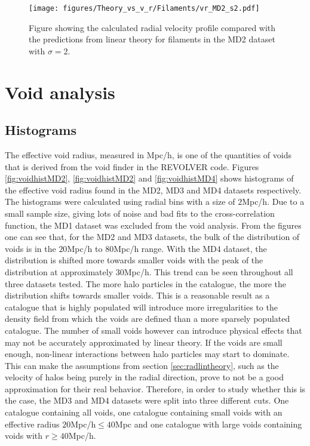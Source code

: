 \begin{figure}[H]
    \texttt{[image: figures/Theory\_vs\_v\_r/Filaments/vr\_MD2\_s2.pdf]}
    \caption{Figure showing the calculated radial velocity profile compared with the predictions from linear theory for filaments in the MD2 dataset with $\sigma=2$.}
    \label{fig:filvrMD2s2}
\end{figure}
\section{Void analysis}\label{sec:void}
\subsection{Histograms}
The effective void radius, measured in Mpc/h, is one of the quantities of voids that is derived from the void finder in the REVOLVER code. Figures \ref{fig:voidhistMD2}, \ref{fig:voidhistMD2} and \ref{fig:voidhistMD4} shows histograms of the effective void radius found in the MD2, MD3 and MD4 datasets respectively. The histograms were calculated using radial bins with a size of $2$Mpc/h. Due to a small sample size, giving lots of noise and bad fits to the cross-correlation function, the MD1 dataset was excluded from the void analysis. From the figures one can see that, for the MD2 and MD3 datasets, the bulk of the distribution of voids is in the $20$Mpc/h to $80$Mpc/h range. With the MD4 dataset, the distribution is shifted more towards smaller voids with the peak of the distribution at approximately $30$Mpc/h. This trend can be seen throughout all three datasets tested. The more halo particles in the catalogue, the more the distribution shifts towards smaller voids. This is a reasonable result as a catalogue that is highly populated will introduce more irregularities to the density field from which the voids are defined than a more sparsely populated catalogue. The number of small voids however can introduce physical effects that may not be accurately approximated by linear theory. If the voids are small enough, non-linear interactions between halo particles may start to dominate. This can make the assumptions from section \ref{sec:radlintheory}, such as the velocity of halos being purely in the radial direction, prove to not be a good approximation for their real behavior. Therefore, in order to study whether this is the case, the MD3 and MD4 datasets were split into three different cuts. One catalogue containing all voids, one catalogue containing small voids with an effective radius $20$Mpc/h$\leq 40$Mpc and one catalogue with large voids containing voids with $r\geq 40$Mpc/h. 

